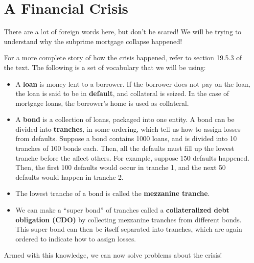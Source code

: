 \documentclass[12pt]{article}
\begin{document}
\newpage


\section{A Financial Crisis}

There are a lot of foreign words here, but don't be scared!  We will be trying to understand why the subprime mortgage collapse happened!

For a more complete story of how the crisis happened, refer to section 19.5.3 of the text.  The following is a set of vocabulary that we will be using:

\begin{itemize}
	\item A \textbf{loan} is money lent to a borrower.  If the borrower does not pay on the loan, the loan is said to be in \textbf{default}, and collateral is seized.
	In the case of mortgage loans, the borrower's home is used as collateral.  
	
	\item A \textbf{bond} is a collection of loans, packaged into one entity.  A bond can be divided into \textbf{tranches}, in some ordering, which tell us how to
	assign losses from defaults.  Suppose a bond contains 1000 loans, and is divided into 10 tranches of 100 bonds each.  Then, all the defaults must fill up the lowest tranche
	before the affect others.  For example, suppose 150 defaults happened.  Then, the first 100 defaults would occur in tranche 1, and the next 50 defaults would happen in tranche 2.

	\item The lowest tranche of a bond is called the \textbf{mezzanine tranche}.  
	
	\item We can make a ``super bond'' of tranches called a \textbf{collateralized debt obligation (CDO)} by collecting mezzanine tranches from different bonds.  This super bond can then be itself separated into tranches, which are again ordered to indicate how to assign losses. 
	
\end{itemize}

Armed with this knowledge, we can now solve problems about the crisis!
\end{document}
